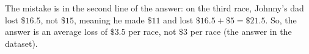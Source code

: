 \documentclass[11pt]{article}
\begin{document}
\noindent The mistake is in the second line of the answer: on the third race, Johnny's dad lost \$$16.5$, not \$$15$, meaning he made \$$11$ and lost $\$16.5 + \$5 = \$21.5$. So, the answer is an average loss of $\$3.5$ per race, not $\$3$ per race (the answer in the dataset).





\begin{verbatim}
    
\end{verbatim}
\end{document}
